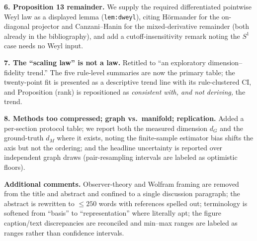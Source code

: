 \documentclass[11pt]{article}
\begin{document}
\textbf{6. Proposition 13 remainder.} We supply the required differentiated
pointwise Weyl law as a displayed lemma (\texttt{lem:dweyl}), citing H\"ormander
for the on-diagonal projector and Canzani--Hanin for the mixed-derivative
remainder (both already in the bibliography), and add a cutoff-insensitivity
remark noting the $S^1$ case needs no Weyl input.

\textbf{7. The ``scaling law'' is not a law.} Retitled to ``an exploratory
dimension--fidelity trend.'' The five rule-level summaries are now the primary
table; the twenty-point fit is presented as a descriptive trend line with its
rule-clustered CI, and Proposition (rank) is repositioned as \emph{consistent
with, and not deriving,} the trend.

\textbf{8. Methods too compressed; graph vs.\ manifold; replication.} Added a
per-section protocol table; we report both the measured dimension $d_G$ and the
ground-truth $d_M$ where it exists, noting the finite-sample estimator bias shifts
the axis but not the ordering; and the headline uncertainty is reported over
independent graph draws (pair-resampling intervals are labeled as optimistic
floors).

\textbf{Additional comments.} Observer-theory and Wolfram framing are removed from
the title and abstract and confined to a single discussion paragraph; the abstract
is rewritten to $\le250$ words with references spelled out; terminology is
softened from ``basis'' to ``representation'' where literally apt; the figure
caption/text discrepancies are reconciled and min--max ranges are labeled as
ranges rather than confidence intervals.
\end{document}
